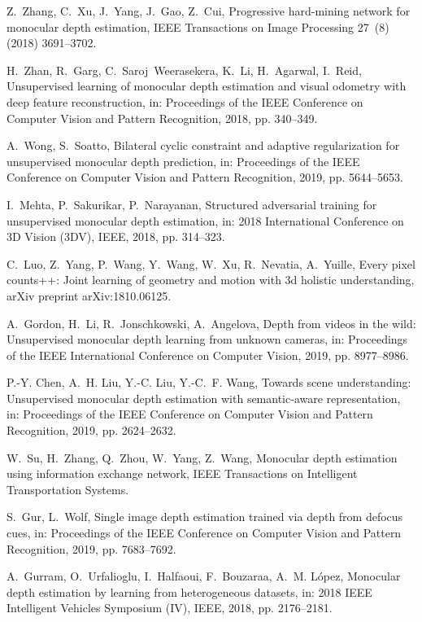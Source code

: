 \documentclass[5p]{elsarticle}
\begin{document}
\begin{thebibliography}{100}
Z.~Zhang, C.~Xu, J.~Yang, J.~Gao, Z.~Cui, Progressive hard-mining network for
  monocular depth estimation, IEEE Transactions on Image Processing 27~(8)
  (2018) 3691--3702.

H.~Zhan, R.~Garg, C.~Saroj~Weerasekera, K.~Li, H.~Agarwal, I.~Reid,
  Unsupervised learning of monocular depth estimation and visual odometry with
  deep feature reconstruction, in: Proceedings of the IEEE Conference on
  Computer Vision and Pattern Recognition, 2018, pp. 340--349.

A.~Wong, S.~Soatto, Bilateral cyclic constraint and adaptive regularization for
  unsupervised monocular depth prediction, in: Proceedings of the IEEE
  Conference on Computer Vision and Pattern Recognition, 2019, pp. 5644--5653.

I.~Mehta, P.~Sakurikar, P.~Narayanan, Structured adversarial training for
  unsupervised monocular depth estimation, in: 2018 International Conference on
  3D Vision (3DV), IEEE, 2018, pp. 314--323.

C.~Luo, Z.~Yang, P.~Wang, Y.~Wang, W.~Xu, R.~Nevatia, A.~Yuille, Every pixel
  counts++: Joint learning of geometry and motion with 3d holistic
  understanding, arXiv preprint arXiv:1810.06125.

A.~Gordon, H.~Li, R.~Jonschkowski, A.~Angelova, Depth from videos in the wild:
  Unsupervised monocular depth learning from unknown cameras, in: Proceedings
  of the IEEE International Conference on Computer Vision, 2019, pp.
  8977--8986.

P.-Y. Chen, A.~H. Liu, Y.-C. Liu, Y.-C.~F. Wang, Towards scene understanding:
  Unsupervised monocular depth estimation with semantic-aware representation,
  in: Proceedings of the IEEE Conference on Computer Vision and Pattern
  Recognition, 2019, pp. 2624--2632.

W.~Su, H.~Zhang, Q.~Zhou, W.~Yang, Z.~Wang, Monocular depth estimation using
  information exchange network, IEEE Transactions on Intelligent Transportation
  Systems.

S.~Gur, L.~Wolf, Single image depth estimation trained via depth from defocus
  cues, in: Proceedings of the IEEE Conference on Computer Vision and Pattern
  Recognition, 2019, pp. 7683--7692.

A.~Gurram, O.~Urfalioglu, I.~Halfaoui, F.~Bouzaraa, A.~M. L{\'o}pez, Monocular
  depth estimation by learning from heterogeneous datasets, in: 2018 IEEE
  Intelligent Vehicles Symposium (IV), IEEE, 2018, pp. 2176--2181.


\end{thebibliography}
\end{document}

